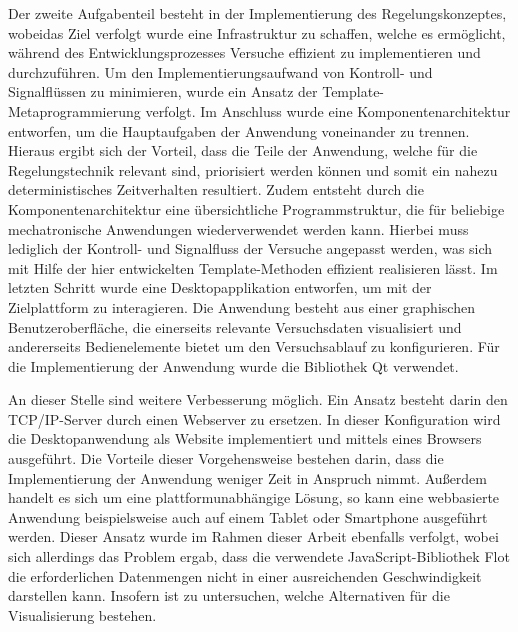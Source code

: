 Der zweite Aufgabenteil besteht in der Implementierung des Regelungskonzeptes, wobeidas Ziel verfolgt wurde eine Infrastruktur zu schaffen, welche es ermöglicht, während des Entwicklungsprozesses Versuche effizient zu implementieren und durchzuführen. Um den Implementierungsaufwand von Kontroll- und Signalflüssen zu minimieren, wurde ein Ansatz der Template-Metaprogrammierung verfolgt. Im Anschluss wurde eine Komponentenarchitektur entworfen, um die Hauptaufgaben der Anwendung voneinander zu trennen. Hieraus ergibt sich der Vorteil, dass die Teile der Anwendung, welche für die Regelungstechnik relevant sind, priorisiert werden können und somit ein nahezu deterministisches Zeitverhalten resultiert. Zudem entsteht durch die Komponentenarchitektur eine übersichtliche Programmstruktur, die für beliebige mechatronische Anwendungen wiederverwendet werden kann. Hierbei muss lediglich der Kontroll- und Signalfluss der Versuche angepasst werden, was sich mit Hilfe der hier entwickelten Template-Methoden effizient realisieren lässt. Im letzten Schritt wurde eine Desktopapplikation entworfen, um mit der Zielplattform zu interagieren. Die Anwendung besteht aus einer graphischen Benutzeroberfläche, die einerseits relevante Versuchsdaten visualisiert und andererseits Bedienelemente bietet um den Versuchsablauf zu konfigurieren. Für die Implementierung der Anwendung wurde die Bibliothek Qt verwendet.

An dieser Stelle sind weitere Verbesserung möglich. Ein Ansatz besteht darin den TCP/IP-Server durch einen Webserver zu ersetzen. In dieser Konfiguration wird die Desktopanwendung als Website implementiert und mittels eines Browsers ausgeführt. Die Vorteile dieser Vorgehensweise bestehen darin, dass die Implementierung der Anwendung weniger Zeit in Anspruch nimmt. Außerdem handelt es sich um eine plattformunabhängige Lösung, so kann eine webbasierte Anwendung beispielsweise auch auf einem Tablet oder Smartphone ausgeführt werden. Dieser  Ansatz wurde im Rahmen dieser Arbeit ebenfalls verfolgt, wobei sich allerdings das Problem ergab, dass die verwendete JavaScript-Bibliothek Flot die erforderlichen Datenmengen nicht in einer ausreichenden Geschwindigkeit darstellen kann. Insofern ist zu untersuchen, welche Alternativen für die Visualisierung bestehen.

